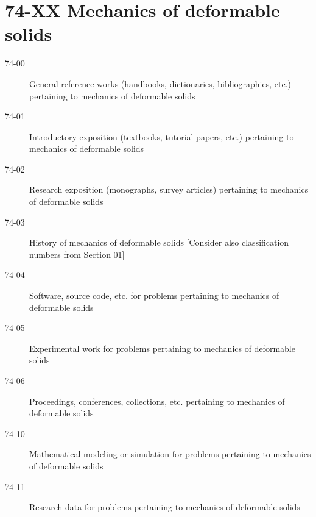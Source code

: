 \section*{74-XX Mechanics of deformable solids }\label{74-XX}
\begin{description}
\item [74-00]\label{74-00} General reference works (handbooks, dictionaries, bibliographies, etc.) pertaining to mechanics of deformable solids
\item [74-01]\label{74-01} Introductory exposition (textbooks, tutorial papers, etc.) pertaining to mechanics of deformable solids
\item [74-02]\label{74-02} Research exposition (monographs, survey articles) pertaining to mechanics of deformable solids
\item [74-03]\label{74-03} History of mechanics of deformable solids [Consider also classification numbers from Section \hyperref[01-XX]{01}]
\item [74-04]\label{74-04} Software, source code, etc. for problems pertaining to mechanics of deformable solids
\item [74-05]\label{74-05} Experimental work for problems pertaining to mechanics of deformable solids
\item [74-06]\label{74-06} Proceedings, conferences, collections, etc. pertaining to mechanics of deformable solids
\item [74-10]\label{74-10} Mathematical modeling or simulation for problems pertaining to mechanics of deformable solids
\item [74-11]\label{74-11} Research data for problems pertaining to mechanics of deformable solids
\end{description}
